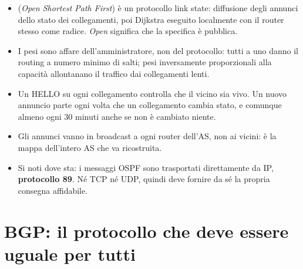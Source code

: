 \begin{itemize}
    \item {} (\emph{Open Shortest Path First}) è un protocollo link state: diffusione degli annunci dello stato dei
          collegamenti, poi Dijkstra eseguito localmente con il router stesso come radice. \emph{Open} significa che la specifica
          è pubblica.
    \item I pesi sono affare dell'amministratore, non del protocollo: tutti a uno danno il routing a numero minimo di salti; pesi
          inversamente proporzionali alla capacità allontanano il traffico dai collegamenti lenti.
    \item Un HELLO su ogni collegamento controlla che il vicino sia vivo. Un nuovo annuncio parte ogni volta che un collegamento
          cambia stato, e comunque almeno ogni 30 minuti anche se non è cambiato niente.
    \item Gli annunci vanno in broadcast a ogni router dell'AS, non ai vicini: è la mappa dell'intero AS che va ricostruita.
    \item Si noti dove sta: i messaggi OSPF sono trasportati direttamente da IP, \textbf{protocollo 89}. Né TCP né UDP, quindi deve
          fornire da sé la propria consegna affidabile.
\end{itemize}


\section{BGP: il protocollo che deve essere uguale per tutti}

